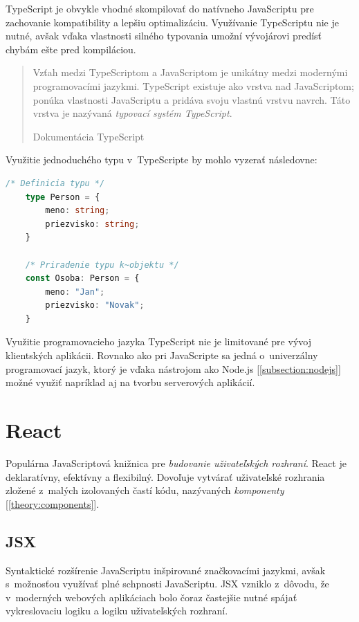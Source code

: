 TypeScript je obvykle vhodné skompilovať do natívneho JavaScriptu pre zachovanie kompatibility a lepšiu optimalizáciu. Využívanie TypeScriptu nie je nutné, avšak vďaka vlastnosti silného typovania umožní vývojárovi predísť chybám ešte pred kompiláciou.

\blockquote[Dokumentácia TypeScript \cite{TSWeb}]{Vzťah medzi TypeScriptom a JavaScriptom je unikátny medzi modernými programovacími jazykmi. TypeScript existuje ako vrstva nad JavaScriptom; ponúka vlastnosti JavaScriptu a pridáva svoju vlastnú vrstvu navrch. Táto vrstva je nazývaná \emph{typovací systém TypeScript}.}

\noindent Využitie jednoduchého typu v~TypeScripte by mohlo vyzerať následovne: \\

\begin{lstlisting}[language=TypeScript, caption=Príklad zápisu v~programovacom jazyku TypeScript.]
	/* Definicia typu */
	type Person = {
		meno: string;
		priezvisko: string;
	}

	/* Priradenie typu k~objektu */
	const Osoba: Person = {
		meno: "Jan";
		priezvisko: "Novak";
	}
\end{lstlisting}

\medskip

\noindent Využitie programovacieho jazyka TypeScript nie je limitované pre vývoj klientských aplikácii. Rovnako ako pri JavaScripte sa jedná o~univerzálny programovací jazyk, ktorý je vďaka nástrojom ako Node.js [\ref{subsection:nodejs}] možné využiť napríklad aj na tvorbu serverových aplikácií.

\section{React}
\label{theory:react}
Populárna JavaScriptová knižnica pre \emph{budovanie uživateľských rozhraní}. React je deklaratívny, efektívny a flexibilný. Dovoľuje vytvárať uživateľské rozhrania zložené z~malých izolovaných častí kódu, nazývaných \emph{komponenty} [\ref{theory:components}]. \cite{React}

\subsection{JSX}
Syntaktické rozšírenie JavaScriptu inšpirované značkovacími jazykmi, avšak s~možnosťou využívať plné schpnosti JavaScriptu. JSX vzniklo z~dôvodu, že v~moderných webových aplikáciach bolo čoraz častejšie nutné spájať vykreslovaciu logiku a logiku uživateľských rozhraní. \cite{React} \\

